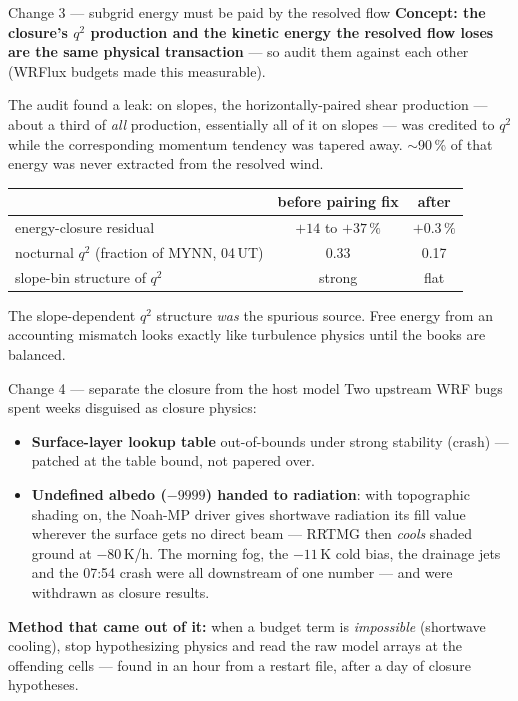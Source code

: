 \documentclass[10pt,aspectratio=169]{beamer}
\begin{document}
\begin{frame}{Change 3 --- subgrid energy must be paid by the resolved flow}
  \textbf{Concept: the closure's $q^2$ production and the kinetic energy the
  resolved flow loses are the same physical transaction} --- so audit them
  against each other (WRFlux budgets made this measurable).
  \vspace{1ex}

  The audit found a leak: on slopes, the horizontally-paired shear production
  --- about a third of \emph{all} production, essentially all of it on slopes ---
  was credited to $q^2$ while the corresponding momentum tendency was tapered
  away. $\sim$90\,\% of that energy was never extracted from the resolved wind.
  \vspace{1ex}
  \begin{center}
  \begin{tabular}{lcc}
    \toprule
     & before pairing fix & after \\
    \midrule
    energy-closure residual & $+14$ to $+37\,\%$ & $+0.3\,\%$ \\
    nocturnal $q^2$ (fraction of MYNN, 04\,UT) & 0.33 & 0.17 \\
    slope-bin structure of $q^2$ & strong & flat \\
    \bottomrule
  \end{tabular}
  \end{center}
  \vspace{1ex}
  The slope-dependent $q^2$ structure \emph{was} the spurious source. Free
  energy from an accounting mismatch looks exactly like turbulence physics
  until the books are balanced.
\end{frame}

\begin{frame}{Change 4 --- separate the closure from the host model}
  Two upstream WRF bugs spent weeks disguised as closure physics:
  \vspace{1ex}
  \begin{itemize}
    \item \textbf{Surface-layer lookup table} out-of-bounds under strong
      stability (crash) --- patched at the table bound, not papered over.
    \item \textbf{Undefined albedo ($-9999$) handed to radiation}: with
      topographic shading on, the Noah-MP driver gives shortwave radiation its
      fill value wherever the surface gets no direct beam --- RRTMG then
      \emph{cools} shaded ground at $-80$\,K/h. The morning fog, the $-11$\,K
      cold bias, the drainage jets and the 07:54 crash were all downstream of
      one number --- and were withdrawn as closure results.
  \end{itemize}
  \vspace{1ex}
  \textbf{Method that came out of it:} when a budget term is \emph{impossible}
  (shortwave cooling), stop hypothesizing physics and read the raw model arrays
  at the offending cells --- found in an hour from a restart file, after a day
  of closure hypotheses.
\end{frame}
\end{document}
